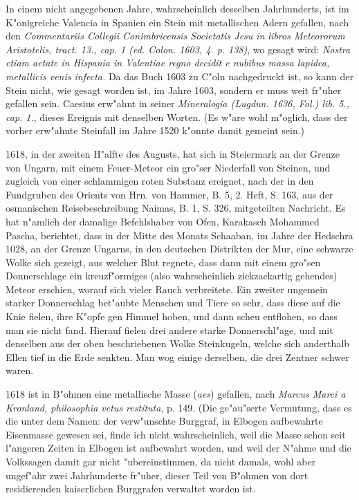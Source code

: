 \documentclass[a4paper, 11pt, oneside, polutonikogreek, german]{article}
\begin{document}
In einem nicht angegebenen Jahre, wahrscheinlich desselben Jahrhunderts, ist im K"onigreiche Valencia in Spanien ein Stein mit metallischen Adern gefallen, nach den \emph{Commentariis Collegii Conimbricensis Societatis Jesu in libros Meteororum Aristotelis, tract. 13., cap. 1 (ed. Colon. 1603, 4. p. 138)}, wo gesagt wird: \emph{Nostra etiam aetate in Hispania in Valentiae regno decidit e nubibus massa lapidea, metallicis venis infecta.} Da das Buch 1603 zu C"oln nachgedruckt ist, so kann der Stein nicht, wie gesagt worden ist, im Jahre 1603, sondern er muss weit fr"uher gefallen sein. Caesius erw"ahnt in seiner \emph{Mineralogia (Lugdun. 1636, Fol.) lib. 5., cap. 1.}, dieses Ereignis mit denselben Worten. (Es w"are wohl m"oglich, dass der vorher erw"ahnte Steinfall im Jahre 1520 k"onnte damit gemeint sein.)

1618, in der zweiten H"alfte des Augusts, hat sich in Steiermark an der Grenze von Ungarn, mit einem Feuer-Meteor ein gro"ser Niederfall von Steinen, und zugleich von einer schlammigen roten Substanz ereignet, nach der in den Fundgruben des Orients von Hrn. von Hammer, B. 5, 2. Heft, S. 163, aus der osmanischen Reisebeschreibung Naimas, B. 1, S. 326, mitgeteilten Nachricht. Es hat n"amlich der damalige Befehlshaber von Ofen, Karakasch Mohammed Pascha, berichtet, dass in der Mitte des Monats Schaaban, im Jahre der Hedschra 1028, an der Grenze Ungarns, in den deutschen Distrikten der Mur, eine schwarze Wolke sich gezeigt, aus welcher Blut regnete, dass dann mit einem gro"sen Donnerschlage ein kreuzf"ormiges (also wahrscheinlich zickzackartig gehendes) Meteor erschien, worauf sich vieler Rauch verbreitete. Ein zweiter ungemein starker Donnerschlag bet"aubte Menschen und Tiere so sehr, dass diese auf die Knie fielen, ihre K"opfe gen Himmel hoben, und dann scheu entflohen, so dass man sie nicht fand. Hierauf fielen drei andere starke Donnerschl"age, und mit denselben aus der oben beschriebenen Wolke Steinkugeln, welche sich anderthalb Ellen tief in die Erde senkten. Man wog einige derselben, die drei Zentner schwer waren.

1618 ist in B"ohmen eine metallische Masse (\emph{aes}) gefallen, nach \emph{Marcus Marci a Kronland, philosophia vetus restituta}, p. 149. (Die ge"au"serte Vermutung, dass es die unter dem Namen: der verw"unschte Burggraf, in Elbogen aufbewahrte Eisenmasse gewesen sei, finde ich nicht wahrscheinlich, weil die Masse schon seit l"angeren Zeiten in Elbogen ist aufbewahrt worden, und weil der N"ahme und die Volkssagen damit gar nicht "ubereinstimmen, da nicht damals, wohl aber ungef"ahr zwei Jahrhunderte fr"uher, dieser Teil von B"ohmen von dort residierenden kaiserlichen Burggrafen verwaltet worden ist.
\end{document}
